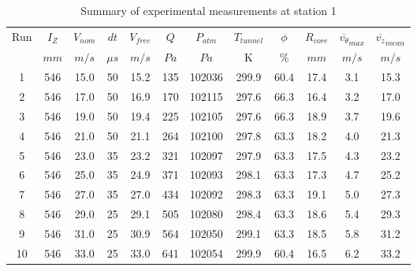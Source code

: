 \begin{table}[H]
\begin{center}
\begin{tabular}{|cccccccccccc|}
	\hline
	Run & $I_Z$ & $V_{nom}$ & $dt$ & $V_{free}$ & $Q$ & $P_{atm}$ & $T_{tunnel}$ & $\phi$ & $R_{core}$ & $\overline{v_{\theta}}_{max}$ & $\overline{v_{z}}_{mean}$\\
	  & $mm$ & $m/s$ & $\mu s$ & $m/s$ & $Pa$ & $Pa$ & K & $\%$ & $mm$ & $m/s$ & $m/s$\\
	\hline
	1 & 546 & 15.0 & 50 & 15.2 & 135 & 102036 & 299.9 & 60.4 & 17.4 & 3.1 & 15.3\\
	2 & 546 & 17.0 & 50 & 16.9 & 170 & 102115 & 297.6 & 66.3 & 16.4 & 3.2 & 17.0\\
	3 & 546 & 19.0 & 50 & 19.4 & 225 & 102105 & 297.6 & 66.3 & 18.9 & 3.7 & 19.6\\
	4 & 546 & 21.0 & 50 & 21.1 & 264 & 102100 & 297.8 & 63.3 & 18.2 & 4.0 & 21.3\\
	5 & 546 & 23.0 & 35 & 23.2 & 321 & 102097 & 297.9 & 63.3 & 17.5 & 4.3 & 23.2\\
	6 & 546 & 25.0 & 35 & 24.9 & 371 & 102093 & 298.1 & 63.3 & 17.3 & 4.7 & 25.2\\
	7 & 546 & 27.0 & 35 & 27.0 & 434 & 102092 & 298.3 & 63.3 & 19.1 & 5.0 & 27.3\\
	8 & 546 & 29.0 & 25 & 29.1 & 505 & 102080 & 298.4 & 63.3 & 18.6 & 5.4 & 29.3\\
	9 & 546 & 31.0 & 25 & 30.9 & 564 & 102050 & 299.1 & 63.3 & 18.5 & 5.8 & 31.2\\
	10 & 546 & 33.0 & 25 & 33.0 & 641 & 102054 & 299.9 & 60.4 & 16.5 & 6.2 & 33.2\\
	\hline
\end{tabular}
\caption{Summary of experimental measurements at station 1}
\label{table:experiment_results_1}
\end{center}
\end{table}
